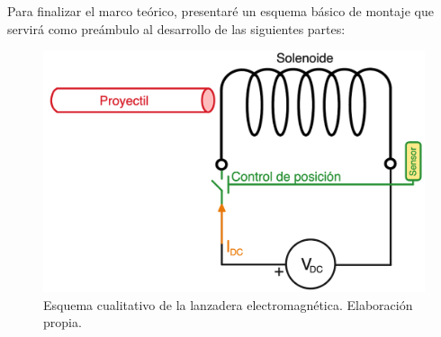 Para finalizar el marco teórico, presentaré un esquema básico de montaje que servirá como preámbulo al desarrollo de las siguientes partes:

\begin{figure}[H]
    \centering %
    \includegraphics[width=14cm]{FigurasMemoria/esquemabasico.png}
    \caption{Esquema cualitativo de la lanzadera electromagnética. Elaboración propia.}
    \label{fig:esquemabasico} %
\end{figure}
